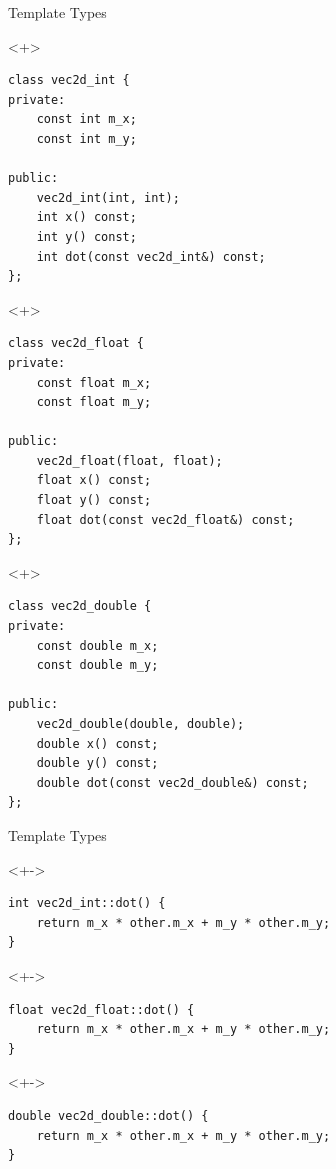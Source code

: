 \documentclass[table]{beamer}
\begin{document}
\begin{frame}[fragile]{Template Types}
  \begin{onlyenv}<+>
    \begin{verbatim}
class vec2d_int {
private:
    const int m_x;
    const int m_y;

public:
    vec2d_int(int, int);
    int x() const;
    int y() const;
    int dot(const vec2d_int&) const;
};
    \end{verbatim}
  \end{onlyenv}

  \begin{onlyenv}<+>
    \begin{verbatim}
class vec2d_float {
private:
    const float m_x;
    const float m_y;

public:
    vec2d_float(float, float);
    float x() const;
    float y() const;
    float dot(const vec2d_float&) const;
};
    \end{verbatim}
  \end{onlyenv}

  \begin{onlyenv}<+>
    \begin{verbatim}
class vec2d_double {
private:
    const double m_x;
    const double m_y;

public:
    vec2d_double(double, double);
    double x() const;
    double y() const;
    double dot(const vec2d_double&) const;
};
    \end{verbatim}
  \end{onlyenv}
\end{frame}

\begin{frame}[fragile]{Template Types}
  \begin{uncoverenv}<+->
    \begin{verbatim}
int vec2d_int::dot() {
    return m_x * other.m_x + m_y * other.m_y;
}
    \end{verbatim}
  \end{uncoverenv}

  \begin{uncoverenv}<+->
\begin{verbatim}
float vec2d_float::dot() {
    return m_x * other.m_x + m_y * other.m_y;
}
    \end{verbatim}
  \end{uncoverenv}

    \begin{uncoverenv}<+->
\begin{verbatim}
double vec2d_double::dot() {
    return m_x * other.m_x + m_y * other.m_y;
}
    \end{verbatim}
  \end{uncoverenv}
\end{frame}
\end{document}
